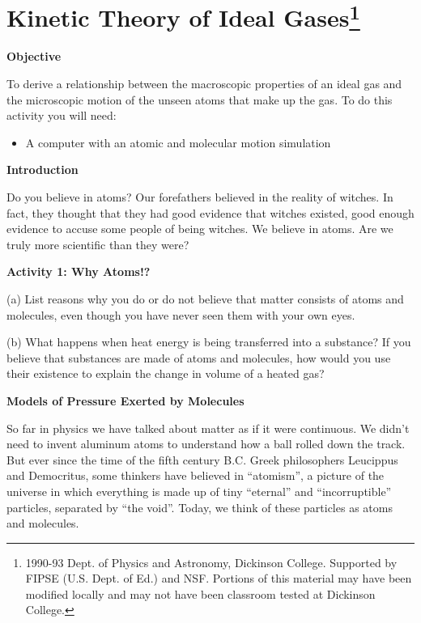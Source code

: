 
\section{Kinetic Theory of Ideal Gases\footnote{%
1990-93 Dept. of Physics and Astronomy, Dickinson College. Supported
by FIPSE (U.S. Dept. of Ed.) and NSF. Portions of this material may
have been modified locally and may not have been classroom tested
at Dickinson College.
}}

\makelabheader %

\textbf{Objective} 

To derive a relationship between the macroscopic properties of an
ideal gas and the microscopic motion of the unseen atoms that make
up the gas. To do this activity you will need:

\begin{itemize}
\item A computer with an atomic and molecular motion simulation
\end{itemize}
\textbf{Introduction}

Do you believe in atoms? Our forefathers believed in the reality of
witches. In fact, they thought that they had good evidence that witches
existed, good enough evidence to accuse some people of being witches.
We believe in atoms. Are we truly more scientific than they were?

\textbf{Activity 1: Why Atoms!?}

(a) List reasons why you do or do not believe that matter consists
of atoms and molecules, even though you have never seen them with
your own eyes.
\vspace{20mm}

(b) What happens when heat energy is being transferred into a substance?
If you believe that substances are made of atoms and molecules, how
would you use their existence to explain the change in volume of a
heated gas?
\vspace{20mm}

\textbf{Models of Pressure Exerted by Molecules}

So far in physics we have talked about matter as if it were continuous.
We didn't need to invent aluminum atoms to understand how a ball rolled
down the track. But ever since the time of the fifth century B.C.
Greek philosophers Leucippus and Democritus, some thinkers have believed
in ``atomism'', a picture of the universe in which everything
is made up of tiny ``eternal'' and ``incorruptible'' particles,
separated by ``the void''. Today, we think of these particles
as atoms and molecules.

